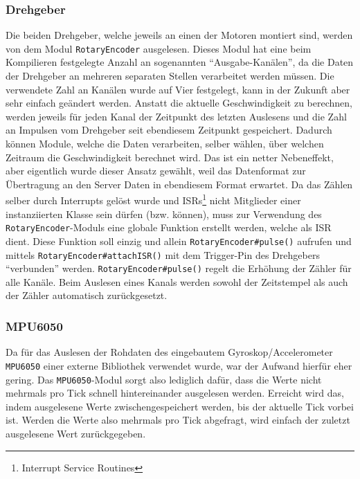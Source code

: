 \subsubsection{Drehgeber}
Die beiden Drehgeber,
welche jeweils an einen der Motoren montiert sind,
werden von dem Modul \texttt{RotaryEncoder} ausgelesen.
%
Dieses Modul hat eine beim Kompilieren festgelegte Anzahl an sogenannten ``Ausgabe-Kanälen'',
da die Daten der Drehgeber an mehreren separaten Stellen verarbeitet werden müssen.
%
Die verwendete Zahl an Kanälen wurde auf Vier festgelegt, kann in der Zukunft aber sehr einfach geändert werden.
%
Anstatt die aktuelle Geschwindigkeit zu berechnen,
werden jeweils für jeden Kanal der Zeitpunkt des letzten Auslesens
und die Zahl an Impulsen vom Drehgeber seit ebendiesem Zeitpunkt gespeichert.
%
Dadurch können Module, welche die Daten verarbeiten,
selber wählen, über welchen Zeitraum die Geschwindigkeit berechnet wird.
%
Das ist ein netter Nebeneffekt, aber eigentlich wurde dieser Ansatz gewählt,
weil das Datenformat zur Übertragung an den Server Daten in ebendiesem Format erwartet.
%
Da das Zählen selber durch Interrupts gelöst wurde
und ISRs\footnote{Interrupt Service Routines}
nicht Mitglieder einer instanziierten Klasse sein dürfen (bzw. können),
muss zur Verwendung des \texttt{RotaryEncoder}-Moduls eine globale Funktion erstellt werden,
welche als ISR dient.
Diese Funktion soll einzig und allein \texttt{RotaryEncoder\#pulse()} aufrufen
und mittels \texttt{RotaryEncoder\#attachISR()} mit dem Trigger-Pin des Drehgebers ``verbunden'' werden.
%
\texttt{RotaryEncoder\#pulse()} regelt die Erhöhung der Zähler für alle Kanäle.
%
Beim Auslesen eines Kanals werden sowohl der Zeitstempel als auch der Zähler automatisch zurückgesetzt.

\subsubsection{MPU6050}
Da für das Auslesen der Rohdaten des eingebautem Gyroskop/Accelerometer
\texttt{MPU6050} einer externe Bibliothek \cite{adafruit-mpu6050} verwendet wurde,
war der Aufwand hierfür eher gering.
%
Das \texttt{MPU6050}-Modul sorgt also lediglich dafür,
dass die Werte nicht mehrmals pro Tick schnell hintereinander ausgelesen werden.
%
Erreicht wird das, indem ausgelesene Werte zwischengespeichert werden,
bis der aktuelle Tick vorbei ist.
%
Werden die Werte also mehrmals pro Tick abgefragt,
wird einfach der zuletzt ausgelesene Wert zurückgegeben.

